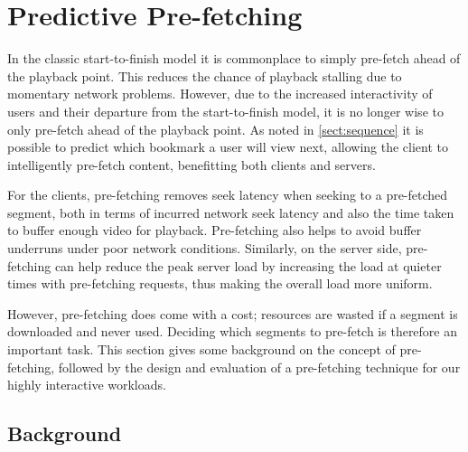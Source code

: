 

\section{Predictive Pre-fetching}

In the classic start-to-finish model it is commonplace to simply pre-fetch ahead of the playback point. This reduces the chance of playback stalling due to momentary network problems. However, due to the increased interactivity of users and their departure from the start-to-finish model, it is no longer wise to only pre-fetch ahead of the playback point. As noted in \autoref{sect:sequence} it is possible to predict which bookmark a user will view next, allowing the client to intelligently pre-fetch content, benefitting both clients and servers.

For the clients, pre-fetching removes seek latency when seeking to a pre-fetched segment, both in terms of incurred network seek latency and also the time taken to buffer enough video for playback.  Pre-fetching also helps to avoid buffer underruns under poor network conditions. Similarly, on the server side, pre-fetching can help reduce the peak server load by increasing the load at quieter times with pre-fetching requests, thus making the overall load more uniform.


However, pre-fetching does come with a cost; resources are wasted if a segment is downloaded and never used. Deciding which segments to pre-fetch is therefore an important task. This section gives some background on the concept of pre-fetching, followed by the design and evaluation of a pre-fetching technique for our highly interactive workloads.

\subsection{Background}

